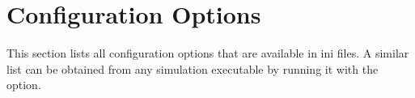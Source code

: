 \label{cha:config-options}

\section{Configuration Options}
\label{sec:config-options:config-options}


This section lists all configuration options that are available in ini files.
A similar list can be obtained from any simulation executable by running it
with the  option.


